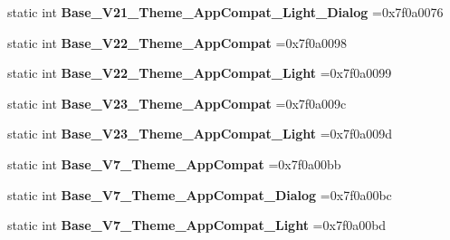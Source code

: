 \begin{DoxyCompactItemize}
static int {\bfseries Base\+\_\+\+V21\+\_\+\+Theme\+\_\+\+App\+Compat\+\_\+\+Light\+\_\+\+Dialog} =0x7f0a0076
\item 
\mbox{\label{classandroid_1_1support_1_1design_1_1R_1_1style_a0f3a440149cd504fde51434cb54fc6af}} 
static int {\bfseries Base\+\_\+\+V22\+\_\+\+Theme\+\_\+\+App\+Compat} =0x7f0a0098
\item 
\mbox{\label{classandroid_1_1support_1_1design_1_1R_1_1style_ae39fa5d7c88858733464a2033b705053}} 
static int {\bfseries Base\+\_\+\+V22\+\_\+\+Theme\+\_\+\+App\+Compat\+\_\+\+Light} =0x7f0a0099
\item 
\mbox{\label{classandroid_1_1support_1_1design_1_1R_1_1style_abb1116d7374eb21f5e71d17913e3cc1c}} 
static int {\bfseries Base\+\_\+\+V23\+\_\+\+Theme\+\_\+\+App\+Compat} =0x7f0a009c
\item 
\mbox{\label{classandroid_1_1support_1_1design_1_1R_1_1style_a54aae8bdb3ba921868c45ed3622a575e}} 
static int {\bfseries Base\+\_\+\+V23\+\_\+\+Theme\+\_\+\+App\+Compat\+\_\+\+Light} =0x7f0a009d
\item 
\mbox{\label{classandroid_1_1support_1_1design_1_1R_1_1style_abef3d4636043965fcfaf75a2f1133f79}} 
static int {\bfseries Base\+\_\+\+V7\+\_\+\+Theme\+\_\+\+App\+Compat} =0x7f0a00bb
\item 
\mbox{\label{classandroid_1_1support_1_1design_1_1R_1_1style_af5caa500391f3884e91dbb90e054e9a6}} 
static int {\bfseries Base\+\_\+\+V7\+\_\+\+Theme\+\_\+\+App\+Compat\+\_\+\+Dialog} =0x7f0a00bc
\item 
\mbox{\label{classandroid_1_1support_1_1design_1_1R_1_1style_a746782466b08997f9d707e6273d9f08d}} 
static int {\bfseries Base\+\_\+\+V7\+\_\+\+Theme\+\_\+\+App\+Compat\+\_\+\+Light} =0x7f0a00bd
\item 
\mbox{\label{classandroid_1_1support_1_1design_1_1R_1_1style_a18040fdffa22d3a91da06b2493b90bb9}} 

\end{DoxyCompactItemize}
